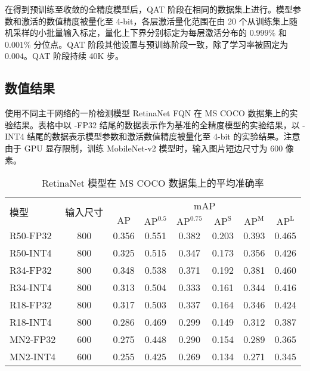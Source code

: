 在得到预训练至收敛的全精度模型后，QAT 阶段在相同的数据集上进行。模型参数和激活的数值精度被量化至 4-bit，各层激活量化范围在由 20 个从训练集上随机采样的小批量输入标定，量化上下界分别标定为每层激活分布的 $0.999\%$ 和 $0.001\%$ 分位点。QAT 阶段其他设置与预训练阶段一致，除了学习率被固定为 $0.004$。QAT 阶段持续 40K 步。
\subsection{数值结果} \label{sec::fqn::main_exp}

\begin{table}[p]
  \centering
  \caption{使用不同主干网络的一阶检测模型 RetinaNet FQN 在 MS COCO 数据集上的实验结果。表格中以 -FP32 结尾的数据表示作为基准的全精度模型的实验结果，以 -INT4 结尾的数据表示模型参数和激活数值精度被量化至 4-bit 的实验结果。注意由于 GPU 显存限制，训练 MobileNet-v2 模型时，输入图片短边尺寸为 600 像素。}
  \label{tab::fqn::retina_coco}
  \begin{subtable}[t]{\columnwidth}
    \centering
    \caption{RetinaNet 模型在 MS COCO 数据集上的平均准确率}
    \label{tab::fqn::retina_coco_mAP}
    \begin{tabular}{lc*{6}{c}}
      \toprule
      \multirow{2}{*}{模型} & \multirow{2}{*}{输入尺寸} & \multicolumn{6}{c}{mAP}  \\
      & & $\mathrm{AP}$ & $\mathrm{AP}^{0.5}$ & $\mathrm{AP}^{0.75}$ &
      $\mathrm{AP} ^ {\mathrm{S}}$ & $\mathrm{AP} ^ {\mathrm{M}}$ & $\mathrm{AP} ^ {\mathrm{L}}$ \\
      \midrule
      R50-FP32 & 800 & 0.356 &0.551 &0.382 &0.203 &0.393 &0.465 \\
      R50-INT4 & 800 & 0.325 &0.515 &0.347 &0.173 &0.356 &0.426 \\
      \hdashline
      R34-FP32 & 800 & 0.348 &0.538 &0.371 &0.192 &0.381 &0.460 \\
      R34-INT4 & 800 & 0.313 &0.504 &0.333 &0.161 &0.344 &0.416 \\
      \hdashline
      R18-FP32 & 800 & 0.317 &0.503 &0.337 &0.164 &0.346 &0.424 \\
      R18-INT4 & 800 & 0.286 &0.469 &0.299 &0.149 &0.312 &0.387 \\
      \hdashline
      MN2-FP32 & 600 & 0.275 &0.448 &0.290 &0.154 &0.289 &0.365 \\
      MN2-INT4 & 600 & 0.255 &0.425 &0.269 &0.134 &0.271 &0.345 \\

\end{tabular}
\end{subtable}
\end{table}
